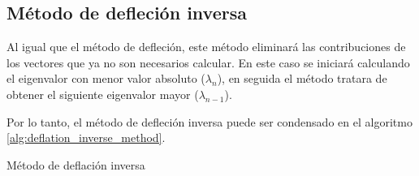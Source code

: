 \subsection{Método de defleción inversa}

Al igual que el método de defleción, este método eliminará las contribuciones de los vectores que ya no son necesarios calcular. En este caso se iniciará calculando el eigenvalor con menor valor absoluto ($\lambda_n$), en seguida el método tratara de obtener el siguiente eigenvalor mayor ($\lambda_{n-1}$).

Por lo tanto, el método de defleción inversa puede ser condensado en el algoritmo \ref{alg:deflation_inverse_method}.

\begin{algorithm}[H]
    \caption{Método de deflación inversa}
    \label{alg:deflation_inverse_method}
\end{algorithm}